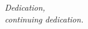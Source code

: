 
\thispagestyle{empty}


\vspace*{3cm}


\medskip

\begin{flushright}
\textit{Dedication, \\ continuing dedication.} \\ \smallskip
\end{flushright}